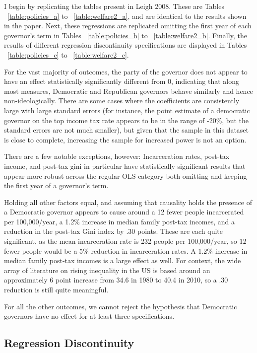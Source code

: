 \documentclass{article}
\begin{document}
I begin by replicating the tables present in Leigh 2008. These are Tables ~\ref{table:policies_a} to ~\ref{table:welfare2_a}, and are identical to the results shown in the paper. Next, these regressions are replicated omitting the first year of each governor's term in Tables  ~\ref{table:policies_b} to ~\ref{table:welfare2_b}. Finally, the results of different regression discontinuity specifications are displayed in Tables  ~\ref{table:policies_c} to ~\ref{table:welfare2_c}. 

For the vast majority of outcomes, the party of the governor does not appear to have an effect statistically significantly different from 0, indicating that along most measures, Democratic and Republican governors behave similarly and hence non-ideologically. There are some cases where the coefficients are consistently large with large standard errors (for instance, the point estimate of a democratic governor on the top income tax rate appears to be in the range of -20\%, but the standard errors are not much smaller), but given that the sample in this dataset is close to complete, increasing the sample for increased power is not an option.

There are a few notable exceptions, however: Incarceration rates, post-tax income, and post-tax gini in particular have statistically significant results that appear more robust across the regular OLS category both omitting and keeping the first year of a governor's term. 

Holding all other factors equal, and assuming that causality holds the presence of a Democratic governor appears to cause around a 12 fewer people incarcerated per 100,000/year, a 1.2\% increase in median family post-tax incomes, and a reduction in the post-tax Gini index by .30 points. These are each quite significant, as the mean incarceration rate is 232 people per 100,000/year, so 12 fewer people would be a 5\% reduction in incarceration rates. A 1.2\% increase in median family post-tax incomes is a large effect as well. For context, the wide array of literature on rising inequality in the US is based around an approximately 6 point increase from 34.6 in 1980 to 40.4 in 2010, so a .30 reduction is still quite meaningful.

For all the other outcomes, we cannot reject the hypothesis that Democratic governors have no effect for at least three specifications. 

\subsection{Regression Discontinuity}
\end{document}
